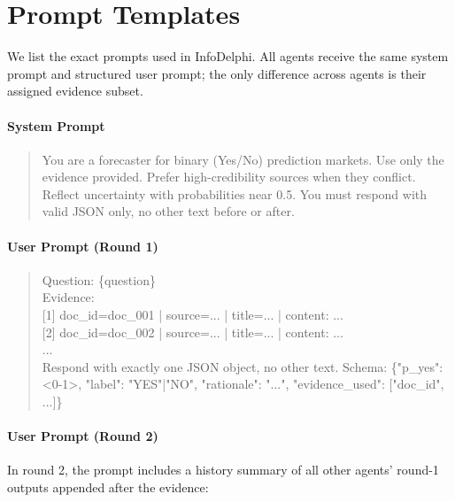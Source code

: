 \documentclass[11pt]{article}
\theoremstyle{plain}
\theoremstyle{definition}
\begin{document}
\section{Prompt Templates}
\label{sec:appendix_prompts}

We list the exact prompts used in InfoDelphi. All agents receive the same system prompt and structured user prompt; the only difference across agents is their assigned evidence subset.

\paragraph{System Prompt}

\begin{quote}
\small\ttfamily
You are a forecaster for binary (Yes/No) prediction markets. Use only the evidence provided. Prefer high-credibility sources when they conflict. Reflect uncertainty with probabilities near 0.5. You must respond with valid JSON only, no other text before or after.
\end{quote}


\paragraph{User Prompt (Round 1)}

\begin{quote}
\small\ttfamily
Question: \{question\}\\[4pt]
Evidence:\\
{[}1{]} doc\_id=doc\_001 | source=... | title=... | content: ...\\
{[}2{]} doc\_id=doc\_002 | source=... | title=... | content: ...\\
...\\[4pt]
Respond with exactly one JSON object, no other text. Schema: \{"p\_yes": <0-1>, "label": "YES"|"NO", "rationale": "...", "evidence\_used": {[}"doc\_id", ...{]}\}
\end{quote}

\paragraph{User Prompt (Round 2)}

In round 2, the prompt includes a history summary of all other agents' round-1 outputs appended after the evidence:
\end{document}
